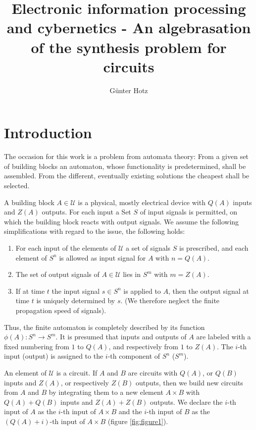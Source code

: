 \documentclass{article}
\begin{document}
\setcounter{section}{-1}

\title{Electronic information processing and cybernetics - An algebrasation of the synthesis problem for circuits}
\author{G\"{u}nter Hotz}
\maketitle

\section{Introduction}
The occasion for this work is a problem from automata theory: From a given set of building blocks an automaton, whose functionality is predetermined, shall be assembled. From the different, eventually existing  solutions the cheapest shall be selected. 

A building block $A \in \mathcal{U}$ is a physical, mostly electrical device with $Q(A)$ inputs and $Z(A)$ outputs. For each input a Set $S$ of input signals is permitted, on which the building block reacts with output signals. We assume the following simplifications with regard to the issue, the following holds:

\begin{enumerate}
\item For each input of the elements of $\mathcal{U}$ a set of signals $S$ is prescribed, and each element of $S^n$ is allowed as input signal for $A$ with $n = Q(A)$.
\item The set of output signals of $A \in \mathcal{U}$ lies in $S^m$ with $m = Z(A)$.
\item If at time $t$ the input signal $s \in S^n$ is applied to $A$, then the output signal at time $t$ is uniquely determined by $s$. (We therefore neglect the finite propagation speed of signals).
\end{enumerate}

Thus, the finite automaton is completely described by its function $\phi(A):S^n \rightarrow S^m$. It is presumed that inputs and outputs of $A$ are labeled with a fixed numbering from $1$ to $Q(A)$, and respectively from $1$ to $Z(A)$. The $i$-th input (output) is assigned to the $i$-th component of $S^n$ ($S^m$). 

An element of $\mathcal{U}$ is a circuit. If $A$ and $B$ are circuits with $Q(A)$, or $Q(B)$ inputs and $Z(A)$, or respectively $Z(B)$ outputs, then we build new circuits from $A$ and $B$ by integrating them to a new element $A\times B$ with $Q(A)+Q(B)$ inputs and $Z(A)+Z(B)$ outputs. We declare the $i$-th input of $A$ as the $i$-th input of $A\times B$ and the $i$-th input of $B$ as the $(Q(A) + i)$-th input of $A\times B$ (figure \ref{fig:figure1}).
\end{document}
